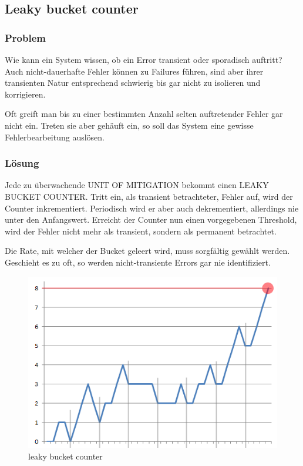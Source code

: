 \subsection{Leaky bucket counter}


\subsubsection*{Problem}


Wie kann ein System wissen, ob ein Error transient oder sporadisch auftritt? Auch nicht-dauerhafte Fehler können zu Failures führen, sind aber ihrer transienten Natur entsprechend schwierig bis gar nicht zu isolieren und korrigieren.

Oft greift man bis zu einer bestimmten Anzahl selten auftretender Fehler gar nicht ein. Treten sie aber gehäuft ein, so soll das System eine gewisse Fehlerbearbeitung auslösen.

\subsubsection*{Lösung}


Jede zu überwachende UNIT OF MITIGATION bekommt einen LEAKY BUCKET COUNTER. Tritt ein, als transient betrachteter, Fehler auf, wird der Counter inkrementiert. Periodisch wird er aber auch dekrementiert, allerdings nie unter den Anfangswert. Erreicht der Counter nun einen vorgegebenen Threshold, wird der Fehler nicht mehr als transient, sondern als permanent betrachtet.

Die Rate, mit welcher der Bucket geleert wird, muss sorgfältig gewählt werden. Geschieht es zu oft, so werden nicht-transiente Errors gar nie identifiziert.

\begin{figure}[H]
	\centering
	\includegraphics[width=\textwidth]{content/faulttolerance/images/leaky_bucket_counter.png}
	\caption{leaky bucket counter}
\end{figure}


